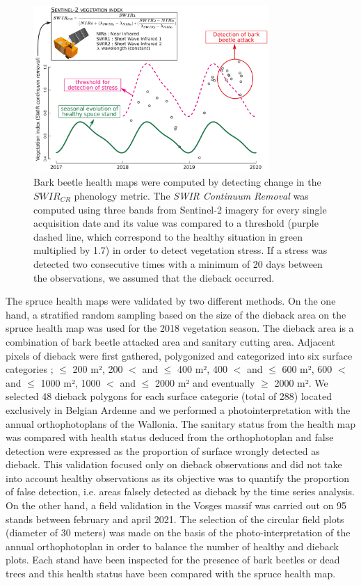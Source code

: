 \documentclass[3p,procedia]{elsarticle}
\begin{document}
\begin{figure}[htbp] 
	\centering
	\includegraphics[width=0.8\textwidth]{fctHarmo.png}
	\caption{Bark beetle health maps were computed by detecting change in the $SWIR_{CR}$ phenology metric. The \textit{SWIR Continuum Removal} was computed using three bands from Sentinel-2 imagery for every single acquisition date and its value was compared to a threshold (purple dashed line, which correspond to the healthy situation in green multiplied by 1.7) in order to detect vegetation stress. If a stress was detected two consecutive times with a minimum of 20 days between the observations, we assumed that the dieback occurred.}
	\label{fig:harmo}
\end{figure}

The spruce health maps were validated by two different methods.
On the one hand, a stratified random sampling based on the size of the dieback area on the spruce health map was used for the 2018 vegetation season.
The dieback area is a combination of bark beetle attacked area and sanitary cutting area.
Adjacent pixels of dieback were first gathered, polygonized and categorized into six surface categories ; $\leq$ 200 m²,  200 $<$ and $\leq$ 400 m², 400 $<$ and $\leq$ 600 m², 600 $<$ and $\leq$ 1000 m², 1000 $<$ and $\leq$ 2000 m² and eventually $\geq$ 2000 m².
We selected 48 dieback polygons for each surface categorie (total of 288) located exclusively in Belgian Ardenne and we performed a photointerpretation with the annual orthophotoplans of the Wallonia. 
The sanitary status from the health map was compared with health status deduced from the orthophotoplan and false detection were expressed as the proportion of surface wrongly detected as dieback.
This validation focused only on dieback observations and did not take into account healthy observations as its objective was to quantify the proportion of false detection, i.e. areas falsely detected as dieback by the time series analysis.
On the other hand, a field validation in the Vosges massif was carried out on 95 stands between february and april 2021.
The selection of the circular field plots (diameter of 30 meters) was made on the basis of the photo-interpretation of the annual orthophotoplan in order to balance the number of healthy and dieback plots. 
Each stand have been inspected for the presence of bark beetles or dead trees and this health status have been compared with the spruce health map. 
\end{document}
